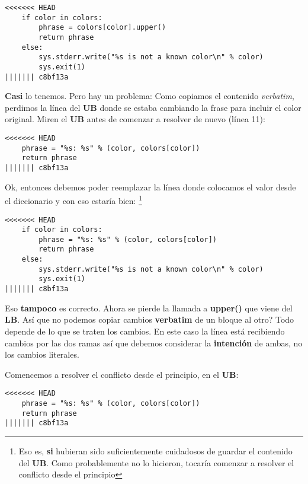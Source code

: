 \begin{lstlisting}[style=python_style, firstnumber=10, caption={\bf Ejemplo 4} - Paso 3 - Copiar desde el LB]
<<<<<<< HEAD
    if color in colors:
        phrase = colors[color].upper()
        return phrase
    else:
        sys.stderr.write("%s is not a known color\n" % color)
        sys.exit(1)
||||||| c8bf13a
\end{lstlisting}
{\bf Casi} lo tenemos. Pero hay un problema: Como copiamos el contenido {\it verbatim}, perdimos la línea del {\bf UB}
donde se estaba cambiando la frase para incluir el color original. Miren el {\bf UB} antes de comenzar a resolver de nuevo (línea 11):

\begin{lstlisting}[style=python_style, firstnumber=10, caption={\bf Ejemplo 4} - Paso 1 - UB]
<<<<<<< HEAD
    phrase = "%s: %s" % (color, colors[color])
    return phrase
||||||| c8bf13a
\end{lstlisting}

Ok, entonces debemos poder reemplazar la línea donde colocamos el valor desde el diccionario y con eso estaría bien:
\footnote{Eso es, {\bf si} hubieran sido suficientemente cuidadosos de guardar el contenido del {\bf UB}. Como probablemente no lo hicieron,
tocaría comenzar a resolver el conflicto desde el principio}
\begin{lstlisting}[style=python_style, firstnumber=10, caption={\bf Ejemplo 4} - Paso 4 - Editar el UB]
<<<<<<< HEAD
    if color in colors:
        phrase = "%s: %s" % (color, colors[color])
        return phrase
    else:
        sys.stderr.write("%s is not a known color\n" % color)
        sys.exit(1)
||||||| c8bf13a
\end{lstlisting}

Eso {\bf tampoco} es correcto. Ahora se pierde la llamada a {\bf upper()} que viene del {\bf LB}. Así que no podemos copiar cambios
{\bf verbatim} de un bloque al otro? Todo depende de lo que se traten los cambios. En este caso la línea está recibiendo
cambios por las dos ramas así que debemos considerar la {\bf intención} de ambas, no los cambios literales.

Comencemos a resolver el conflicto desde el principio, en el {\bf UB}:
\begin{lstlisting}[style=python_style, firstnumber=10, caption={\bf Ejemplo 4} - Paso 1 - UB]
<<<<<<< HEAD
    phrase = "%s: %s" % (color, colors[color])
    return phrase
||||||| c8bf13a
\end{lstlisting}

